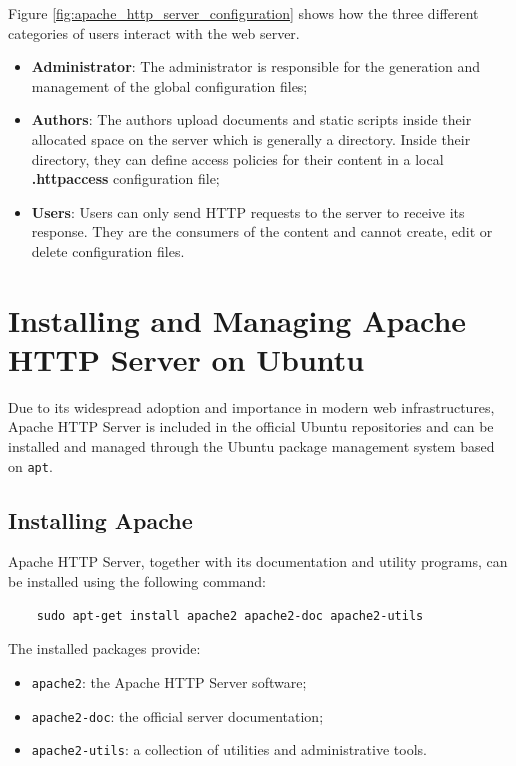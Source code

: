\documentclass{scrbook}
\begin{document}
	Figure \ref{fig:apache_http_server_configuration} shows how the three different categories of users interact with the web server.
	\begin{itemize}
		\item \textbf{Administrator}: The administrator is responsible for the generation and management of the global configuration files;
		
		\item \textbf{Authors}: The authors upload documents and static scripts inside their allocated space on the server which is generally a directory. Inside their directory, they can define access policies for their content in a local \textbf{.httpaccess} configuration file;
		
		\item \textbf{Users}: Users can only send HTTP requests to the server to receive its response. They are the consumers of the content and cannot create, edit or delete configuration files.
	\end{itemize}
	
	\section{Installing and Managing Apache HTTP Server on Ubuntu}
	
	Due to its widespread adoption and importance in modern web infrastructures, Apache HTTP Server is included in the official Ubuntu repositories and can be installed and managed through the Ubuntu package management system based on \texttt{apt}.
	
	\subsection{Installing Apache}
	
	Apache HTTP Server, together with its documentation and utility programs, can be installed using the following command:
	
	\begin{lstlisting}
	sudo apt-get install apache2 apache2-doc apache2-utils
	\end{lstlisting}
	
	The installed packages provide:
	\begin{itemize}
		\item \texttt{apache2}: the Apache HTTP Server software;
		
		\item \texttt{apache2-doc}: the official server documentation;
		
		\item \texttt{apache2-utils}: a collection of utilities and administrative tools.
	\end{itemize}
	
\end{document}
